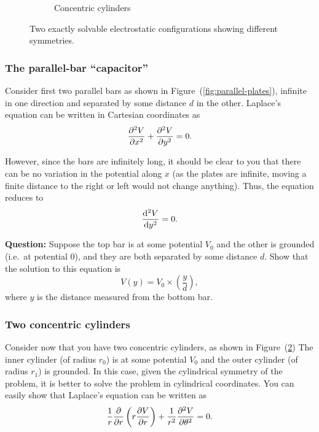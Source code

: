 \begin{figure}[!htb]
\begin{subfigure}[b]{0.4\textwidth}
                \caption{Concentric cylinders}
                \label{fig:concentric-cylinders}
        \end{subfigure}
        \caption{Two exactly solvable electrostatic configurations showing different symmetries.}
        \par\bigskip
\end{figure}


\subsubsection*{The parallel-bar ``capacitor''}

Consider first two parallel bars as shown in Figure~(\ref{fig:parallel-plates}), infinite in one direction and separated by some distance $d$ in the other. Laplace's equation can be written in Cartesian coordinates as
\begin{equation}
    \pdv[2]{V}{x}+\pdv[2]{V}{y} = 0.
\end{equation}

However, since the bars are infinitely long, it should be clear to you that there can be no variation in the potential along $x$ (as the plates are infinite, moving a finite distance to the right or left would not change anything). Thus, the equation reduces to 
\begin{equation}
    \dv[2]{V}{y}= 0.
\end{equation}

\begin{question}
\textbf{Question:} Suppose the top bar is at some potential $V_0$ and the other is grounded (i.e.\ at potential $0$), and they are both separated by some distance $d$. Show that the solution to this equation is
\begin{equation}
    V(y) = V_0 \times \left(\frac{y}{d}\right),
    \label{eqn:parallel-plate-field}
\end{equation}
where $y$ is the distance measured from the bottom bar.
\end{question}


\subsubsection{Two concentric cylinders}

Consider now that you have two concentric cylinders, as shown in Figure~(\ref{fig:concentric-cylinders}) The inner cylinder (of radius $r_0$) is at some potential $V_0$ and the outer cylinder (of radius $r_1$) is grounded. In this case, given the cylindrical symmetry of the problem, it is better to solve the problem in cylindrical coordinates. You can easily show that Laplace's equation can be written as 
\begin{equation}
    \frac{1}{r}\pdv{}{r}\left(r \pdv{V}{r}\right) + \frac{1}{r^2}\pdv[2]{V}{\theta} = 0.
\end{equation}

